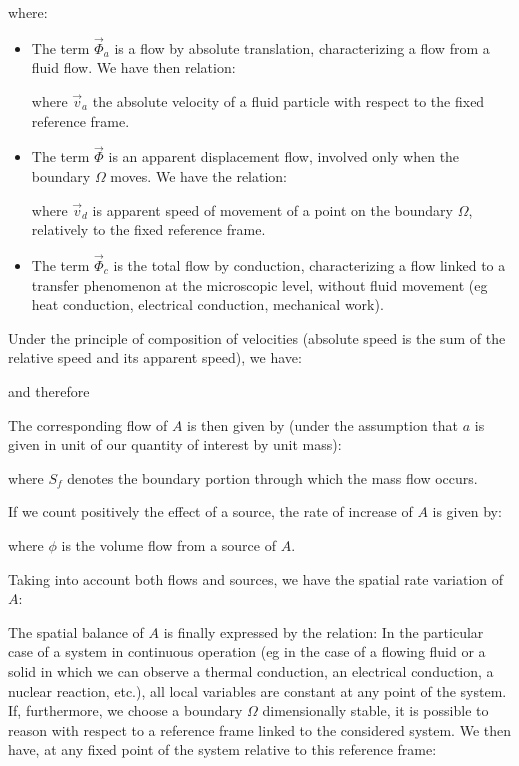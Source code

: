 	where:
	\begin{itemize}
		\item The term $\vec{\Phi}_a$ is a flow by absolute translation, characterizing a flow from a fluid flow. We have then relation:
		
		where $\vec{v}_a$ the absolute velocity of a fluid particle with respect to the fixed reference frame.

		\item The term $\vec{\Phi}$ is an apparent displacement flow, involved only when the boundary $\Omega$ moves. We have the relation:
		
		where $\vec{v}_d$ is apparent speed of movement of a point on the boundary $\Omega$, relatively to the fixed reference frame.

		\item The term $\vec{\Phi}_c$ is the total flow by conduction, characterizing a flow linked to a transfer phenomenon at the microscopic level, without fluid movement (eg heat conduction, electrical conduction, mechanical work).
	\end{itemize}
	Under the principle of composition of velocities (absolute speed is the sum of the relative speed and its apparent speed), we have:
	
	and therefore
	
	The corresponding flow of $A$ is then given by (under the assumption that $a$ is given in unit of our quantity of interest by unit mass):
	
	where $S_f$ denotes the boundary portion through which the mass flow occurs.
	
	If we count positively the effect of a source, the rate of increase of $A$ is given by:
	
	where $\phi$ is the volume flow from a source of $A$.

	Taking into account both flows and sources, we have the spatial rate variation of $A$:
	
	The spatial balance of $A$ is finally expressed by the relation:
	In the particular case of a system in continuous operation (eg in the case of a flowing fluid or a solid in which we can observe a thermal conduction, an electrical conduction, a nuclear reaction, etc.), all local variables are constant at any point of the system. If, furthermore, we choose a boundary $\Omega$ dimensionally stable, it is possible to reason with respect to a reference frame linked to the considered system. We then have, at any fixed point of the system relative to this reference frame:
	
